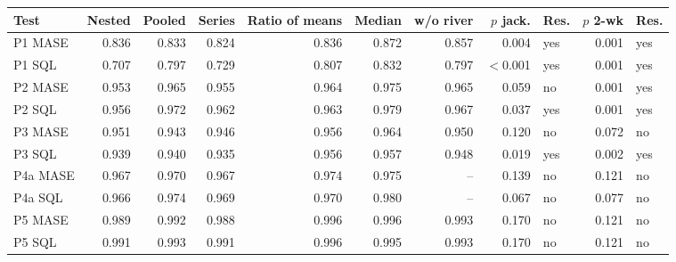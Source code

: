 \begin{tabular}{lrrrrrrrlrl}
\toprule
Test & Nested & Pooled & Series & Ratio of means & Median & w/o river & $p$ jack. & Res. & $p$ 2-wk & Res. \\
\midrule
P1 MASE & 0.836 & 0.833 & 0.824 & 0.836 & 0.872 & 0.857 & 0.004 & yes & 0.001 & yes \\
P1 SQL & 0.707 & 0.797 & 0.729 & 0.807 & 0.832 & 0.797 & $<$0.001 & yes & 0.001 & yes \\
P2 MASE & 0.953 & 0.965 & 0.955 & 0.964 & 0.975 & 0.965 & 0.059 & no & 0.001 & yes \\
P2 SQL & 0.956 & 0.972 & 0.962 & 0.963 & 0.979 & 0.967 & 0.037 & yes & 0.001 & yes \\
P3 MASE & 0.951 & 0.943 & 0.946 & 0.956 & 0.964 & 0.950 & 0.120 & no & 0.072 & no \\
P3 SQL & 0.939 & 0.940 & 0.935 & 0.956 & 0.957 & 0.948 & 0.019 & yes & 0.002 & yes \\
P4a MASE & 0.967 & 0.970 & 0.967 & 0.974 & 0.975 & -- & 0.139 & no & 0.121 & no \\
P4a SQL & 0.966 & 0.974 & 0.969 & 0.970 & 0.980 & -- & 0.067 & no & 0.077 & no \\
P5 MASE & 0.989 & 0.992 & 0.988 & 0.996 & 0.996 & 0.993 & 0.170 & no & 0.121 & no \\
P5 SQL & 0.991 & 0.993 & 0.991 & 0.996 & 0.995 & 0.993 & 0.170 & no & 0.121 & no \\
\bottomrule
\end{tabular}
